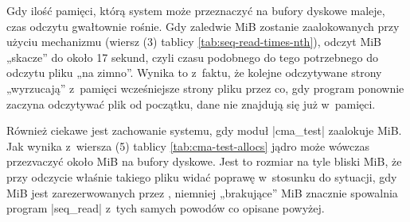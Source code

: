 \begin{table}[tbp]
  \centering
  \vspace{\baselineskip}
  \caption[Czas odczytu pliku, gdy dane były już raz odczytane.]{Czas
    potrzebny do odczytania podanej liczby mebibajtów pliku, gdy dane
    już były raz odczytane.}
\label{tab:seq-read-times-nth}
\end{table}

Gdy ilość pamięci, którą system może przeznaczyć na bufory dyskowe
maleje, czas odczytu gwałtownie rośnie.  Gdy zaledwie \unit[128]{MiB}
zostanie zaalokowanych przy użyciu mechanizmu  (wiersz (3)
tablicy \ref{tab:seq-read-times-nth}), odczyt \unit[900]{MiB} „skacze”
do około 17 sekund, czyli czasu podobnego do tego potrzebnego do
odczytu pliku „na zimno”.  Wynika to z~faktu, że kolejne odczytywane
strony „wyrzucają” z~pamięci wcześniejsze strony pliku przez co, gdy
program ponownie zaczyna odczytywać plik od początku, dane nie
znajdują się już w~pamięci.

Również ciekawe jest zachowanie systemu, gdy moduł \code|cma_test|
zaalokuje \unit[384]{MiB}.  Jak wynika z~wiersza (5) tablicy
\ref{tab:cma-test-allocs} jądro może wówczas przezvaczyć około
\unit[582]{MiB} na bufory dyskowe.  Jest to rozmiar na tyle bliski
\unit[600]{MiB}, że przy odczycie właśnie takiego pliku widać poprawę
w~stosunku do sytuacji, gdy \unit[512]{MiB} jest zarezerwowanych przez
, niemniej „brakujące” \unit[12]{MiB} znacznie spowalnia
program \code|seq_read| z~tych samych powodów co opisane powyżej.

